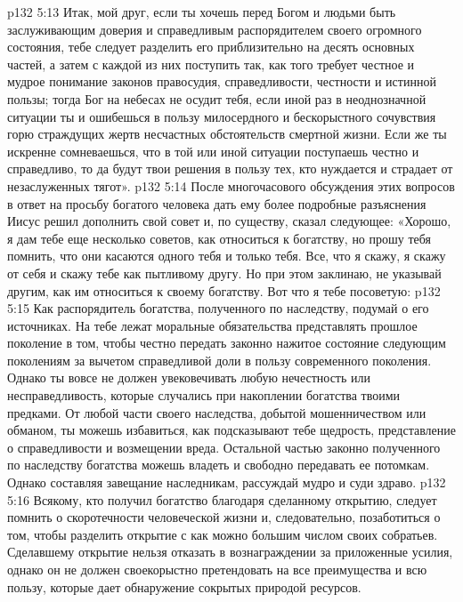 \vs p132 5:13 \pc Итак, мой друг, если ты хочешь перед Богом и людьми быть заслуживающим доверия и справедливым распорядителем своего огромного состояния, тебе следует разделить его приблизительно на десять основных частей, а затем с каждой из них поступить так, как того требует честное и мудрое понимание законов правосудия, справедливости, честности и истинной пользы; тогда Бог на небесах не осудит тебя, если иной раз в неоднозначной ситуации ты и ошибешься в пользу милосердного и бескорыстного сочувствия горю страждущих жертв несчастных обстоятельств смертной жизни. Если же ты искренне сомневаешься, что в той или иной ситуации поступаешь честно и справедливо, то да будут твои решения в пользу тех, кто нуждается и страдает от незаслуженных тягот».
\vs p132 5:14 После многочасового обсуждения этих вопросов в ответ на просьбу богатого человека дать ему более подробные разъяснения Иисус решил дополнить свой совет и, по существу, сказал следующее: «Хорошо, я дам тебе еще несколько советов, как относиться к богатству, но прошу тебя помнить, что они касаются одного тебя и только тебя. Все, что я скажу, я скажу от себя и скажу тебе как пытливому другу. Но при этом заклинаю, не указывай другим, как им относиться к своему богатству. Вот что я тебе посоветую:
\vs p132 5:15 \bibnobreakspace Как распорядитель богатства, полученного по наследству, подумай о его источниках. На тебе лежат моральные обязательства представлять прошлое поколение в том, чтобы честно передать законно нажитое состояние следующим поколениям за вычетом справедливой доли в пользу современного поколения. Однако ты вовсе не должен увековечивать любую нечестность или несправедливость, которые случались при накоплении богатства твоими предками. От любой части своего наследства, добытой мошенничеством или обманом, ты можешь избавиться, как подсказывают тебе щедрость, представление о справедливости и возмещении вреда. Остальной частью законно полученного по наследству богатства можешь владеть и свободно передавать ее потомкам. Однако составляя завещание наследникам, рассуждай мудро и суди здраво.
\vs p132 5:16 \bibnobreakspace Всякому, кто получил богатство благодаря сделанному открытию, следует помнить о скоротечности человеческой жизни и, следовательно, позаботиться о том, чтобы разделить открытие с как можно большим числом своих собратьев. Сделавшему открытие нельзя отказать в вознаграждении за приложенные усилия, однако он не должен своекорыстно претендовать на все преимущества и всю пользу, которые дает обнаружение сокрытых природой ресурсов.
